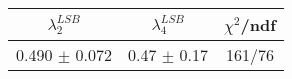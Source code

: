 \begin{tabular}{c|c||c}
$\lambda_{2}^{LSB}$ & $\lambda_4^{LSB}$ & $\chi^{2}$/ndf \\
\hline
0.490 $\pm$ 0.072 & 0.47 $\pm$ 0.17 & 161/76\\
\end{tabular}

